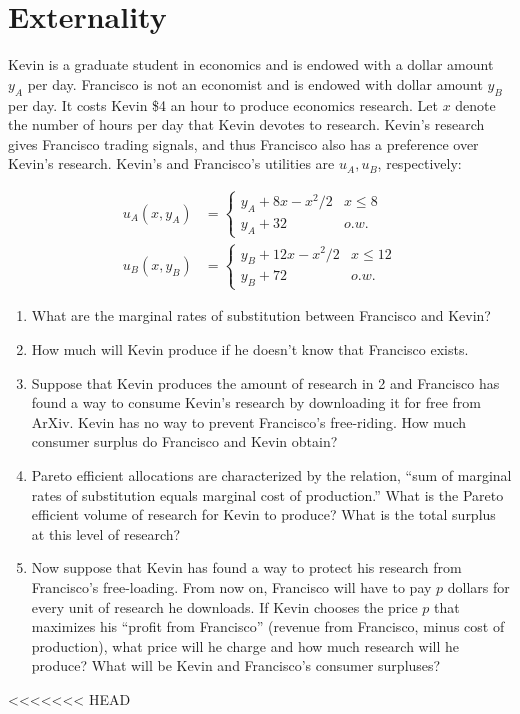 \documentclass[11pt]{article}
\begin{document}
\section{Externality}

Kevin is a graduate student in economics and is endowed with a dollar amount
$y_A$ per day.  Francisco is not an economist and is endowed with dollar amount
$y_B$ per day. It costs Kevin \$4 an hour to produce economics research. Let $x$
denote the number of hours per day that Kevin devotes to research. Kevin's
research gives Francisco trading signals, and thus Francisco also has a
preference over Kevin's research. Kevin's and Francisco's utilities are $u_A,
u_B$, respectively:

\begin{align*}
  u_A(x, y_A) &= \begin{cases}
  y_A + 8x - x^2/2 & x \le 8 \\
  y_A + 32 & o.w.
\end{cases} \\
  u_B(x, y_B) &= \begin{cases}
  y_B + 12x - x^2/2 & x \le 12 \\
  y_B + 72 & o.w.
\end{cases}
\end{align*}
    
\begin{enumerate}

\item What are the marginal rates of substitution between Francisco and Kevin?

\item How much will Kevin produce if he doesn't know that Francisco exists.

\item Suppose that Kevin produces the amount of research in 2 and Francisco has
found a way to consume Kevin's research by downloading it for free from ArXiv.
Kevin has no way to prevent Francisco's free-riding. How much consumer surplus
do Francisco and Kevin obtain?

\item Pareto efficient allocations are characterized by the relation, ``sum of
marginal rates of substitution equals marginal cost of production.'' What is the
Pareto efficient volume of research for Kevin to produce? What is the total
surplus at this level of research?

\item Now suppose that Kevin has found a way to protect his research from
Francisco's free-loading. From now on, Francisco will have to pay $p$ dollars
for every unit of research he downloads. If Kevin chooses the price $p$ that
maximizes his ``profit from Francisco'' (revenue from Francisco, minus cost of
production), what price will he charge and how much research will he produce?
What will be Kevin and Francisco's consumer surpluses?


\end{enumerate}
<<<<<<< HEAD
\end{document}
